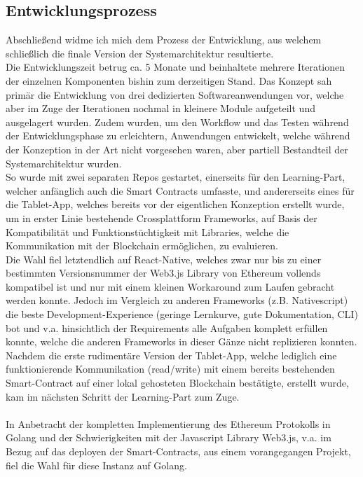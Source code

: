 \subsection{Entwicklungsprozess}
Abschließend widme ich mich dem Prozess der Entwicklung, aus welchem schließlich die finale Version der Systemarchitektur resultierte. \\
Die Entwicklungszeit betrug ca. 5 Monate und beinhaltete mehrere Iterationen der einzelnen Komponenten bishin zum derzeitigen Stand. Das Konzept sah primär die Entwicklung von drei dedizierten Softwareanwendungen vor, welche aber im Zuge der Iterationen nochmal in kleinere Module aufgeteilt und ausgelagert wurden. Zudem wurden, um den Workflow und das Testen während der Entwicklungsphase zu erleichtern, Anwendungen entwickelt, welche während der Konzeption in der Art nicht vorgesehen waren, aber partiell Bestandteil der Systemarchitektur wurden. \\
So wurde mit zwei separaten Repos gestartet, einerseits für den Learning-Part, welcher anfänglich auch die Smart Contracts umfasste, und andererseits eines für die Tablet-App, welches bereits vor der eigentlichen Konzeption erstellt wurde, um in erster Linie bestehende Crossplattform Frameworks, auf Basis der Kompatibilität und Funktionstüchtigkeit mit Libraries, welche die Kommunikation mit der Blockchain ermöglichen, zu evaluieren. \\
Die Wahl fiel letztendlich auf React-Native, welches zwar nur bis zu einer bestimmten Versionsnummer der Web3.js Library von Ethereum vollends kompatibel ist und nur mit einem kleinen Workaround zum Laufen gebracht werden konnte. 
Jedoch im Vergleich zu anderen Frameworks (z.B. Nativescript) die beste Development-Experience (geringe Lernkurve, gute Dokumentation, CLI) bot und v.a. hinsichtlich der Requirements alle Aufgaben komplett erfüllen konnte, welche die anderen Frameworks in dieser Gänze nicht replizieren konnten. \\
Nachdem die erste rudimentäre Version der Tablet-App, welche lediglich eine funktionierende Kommunikation (read/write) mit einem bereits bestehenden Smart-Contract auf einer lokal gehosteten Blockchain bestätigte, erstellt wurde, kam im nächsten Schritt der Learning-Part zum Zuge. \\\\
In Anbetracht der kompletten Implementierung des Ethereum Protokolls in Golang und der Schwierigkeiten mit der Javascript Library Web3.js, v.a. im Bezug auf das deployen der Smart-Contracts, aus einem vorangegangen Projekt, fiel die Wahl für diese Instanz auf Golang. \\
